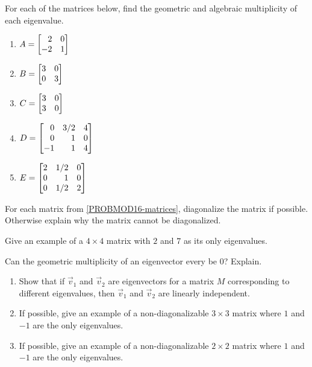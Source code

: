\begin{exercises}
	\begin{problist}
		\prob For each of the matrices below, find the geometric and algebraic multiplicity of
		each eigenvalue. \label{PROBMOD16-matrices}
		\begin{enumerate}
			\item   $A=\mat{2&0\\-2&1}$
			\item   $B=\mat{3&0\\0&3}$
			\item   $C=\mat{3&0\\3&0}$
			\item   $D=\mat{0&3/2&4\\0&1&0\\-1&1&4}$
			\item   $E=\mat{2&1/2&0\\0&1&0\\0&1/2&2}$
		\end{enumerate}
		
		\prob For each matrix from \ref{PROBMOD16-matrices}, diagonalize the matrix if
		possible. Otherwise explain why the matrix cannot be diagonalized.

		\prob Give an example of a $4\times 4$ matrix with $2$ and $7$ as its only eigenvalues.

		\prob Can the geometric multiplicity of an eigenvector every be $0$? Explain.

		\prob \begin{enumerate}
			\item Show that if $\vec v_1$ and $\vec v_2$ are eigenvectors
				for a matrix $M$ corresponding to different eigenvalues,
				then $\vec v_1$ and $\vec v_2$ are linearly independent.
			\item If possible, give an example of a non-diagonalizable $3\times 3$
				matrix where $1$ and $-1$ are the only eigenvalues.
			\item If possible, give an example of a non-diagonalizable $2\times 2$
				matrix where $1$ and $-1$ are the only eigenvalues.
		\end{enumerate}
	\end{problist}
\end{exercises}
